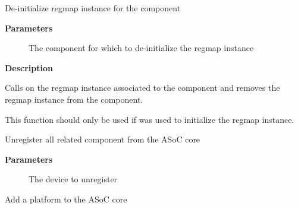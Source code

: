 \documentclass[a4paper,8pt,english]{sphinxmanual}
\begin{document}
\begin{fulllineitems}
\label{sound/kernel-api/alsa-driver-api:c.snd_soc_component_exit_regmap}
De-initialize regmap instance for the component

\end{fulllineitems}


\textbf{Parameters}
\begin{description}
\item[{}] \leavevmode
The component for which to de-initialize the regmap instance

\end{description}

\textbf{Description}

Calls  on the regmap instance associated to the component and
removes the regmap instance from the component.

This function should only be used if {\hyperref[sound/kernel\string-api/alsa\string-driver\string-api:c.snd_soc_component_init_regmap]{\emph{}}} was used
to initialize the regmap instance.

\begin{fulllineitems}
\label{sound/kernel-api/alsa-driver-api:c.__snd_soc_unregister_component}
Unregister all related component from the ASoC core

\end{fulllineitems}


\textbf{Parameters}
\begin{description}
\item[{}] \leavevmode
The device to unregister

\end{description}

\begin{fulllineitems}
\label{sound/kernel-api/alsa-driver-api:c.snd_soc_add_platform}
Add a platform to the ASoC core

\end{fulllineitems}
\end{document}
